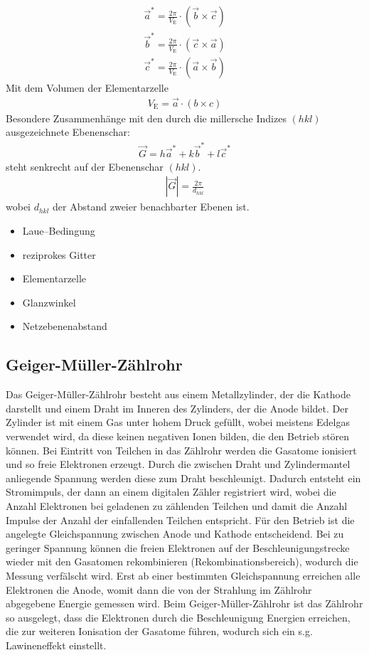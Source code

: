 \documentclass[10pt, a4paper]{article}
\begin{document}
\begin{align}
  \vec{a}^{*} = \frac{2\pi}{V_\mathrm{E}} \cdot ( \vec{b} \times \vec{c} ) \nonumber\\
  \vec{b}^{*} = \frac{2\pi}{V_\mathrm{E}} \cdot ( \vec{c} \times \vec{a} ) \nonumber\\
  \vec{c}^{*} = \frac{2\pi}{V_\mathrm{E}} \cdot ( \vec{a} \times \vec{b} )
\end{align}
Mit dem Volumen der Elementarzelle
\begin{align}
  V_\mathrm{E} = \vec{a} \cdot \left( b \times c \right)
\end{align}
Besondere Zusammenhänge mit den durch die millersche Indizes $(hkl)$ ausgezeichnete Ebenenschar:
\begin{align}
  \vec{G} = h \vec{a}^{*} + k \vec{b}^{*} + l \vec{c}^{*}
\end{align}
steht senkrecht auf der Ebenenschar $(hkl)$.
\begin{align}
  | \vec{G} | = \frac{2\pi}{d_{hkl}}
\end{align}
wobei $d_{hkl}$ der Abstand zweier benachbarter Ebenen ist.



\begin{itemize}
  \item Laue--Bedingung
  \item reziprokes Gitter
  \item Elementarzelle
  \item Glanzwinkel
  \item Netzebenenabstand
\end{itemize}

\subsection{Geiger-Müller-Zählrohr}

Das Geiger-Müller-Zählrohr besteht aus einem Metallzylinder, der die Kathode darstellt und einem Draht im Inneren des Zylinders, der die Anode bildet.
Der Zylinder ist mit einem Gas unter hohem Druck gefüllt, wobei meistens Edelgas verwendet wird, da diese keinen negativen Ionen bilden, die den Betrieb stören können.
Bei Eintritt von Teilchen in das Zählrohr werden die Gasatome ionisiert und so freie Elektronen erzeugt.
Durch die zwischen Draht und Zylindermantel anliegende Spannung werden diese zum Draht beschleunigt.
Dadurch entsteht ein Stromimpuls, der dann an einem digitalen Zähler registriert wird, wobei die Anzahl Elektronen bei geladenen zu zählenden Teilchen und damit die Anzahl Impulse der Anzahl der einfallenden Teilchen entspricht.
Für den Betrieb ist die angelegte Gleichspannung zwischen Anode und Kathode entscheidend.
Bei zu geringer Spannung können die freien Elektronen auf der Beschleunigungstrecke wieder mit den Gasatomen rekombinieren (Rekombinationsbereich), wodurch die Messung verfälscht wird.
Erst ab einer bestimmten Gleichspannung erreichen alle Elektronen die Anode, womit dann die von der Strahlung im Zählrohr abgegebene Energie gemessen wird.
Beim Geiger-Müller-Zählrohr ist das Zählrohr so ausgelegt, dass die Elektronen durch die Beschleunigung Energien erreichen, die zur weiteren Ionisation der Gasatome führen, wodurch sich ein s.g. Lawineneffekt einstellt.
\end{document}

